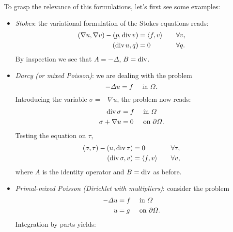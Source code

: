 To grasp the relevance of this formulations, let's first see some examples:
\begin{itemize}
    \item \emph{Stokes}: the variational formulation of the Stokes equations reads:
    \begin{equation}
        \begin{aligned}
            (\nabla u, \nabla v) - (p, \operatorname{\text{div}} v) &= \langle f, v \rangle &&\quad\forall v, \\
            (\operatorname{\text{div}} u, q) &= 0 &&\quad \forall q.
        \end{aligned}
    \end{equation}
    By inspection we see that $A=-\Delta$, $B=\operatorname{\text{div}}$.
    \item \emph{Darcy (or mixed Poisson)}: we are dealing with the problem
    \begin{equation}
        -\Delta u = f\quad \text{ in }\Omega.
    \end{equation}
    Introducing the variable $\sigma = -\nabla u$, the problem now reads:
    \begin{equation}
        \begin{aligned}
            \operatorname{\text{div}} \sigma &= f && \text{ in }  \Omega\\ 
            \sigma + \nabla u &= 0 && \text{ on } \partial\Omega.
        \end{aligned}
    \end{equation}
    Testing the equation on $\tau$,
    \begin{equation}
        \begin{aligned}
            (\sigma, \tau) - (u, \operatorname{\text{div}} \tau) &= 0
            &&\quad\forall \tau, \\ 
            (\operatorname{\text{div}} \sigma, v) &= \langle f,v \rangle
            &&\quad \forall v,
        \end{aligned}
    \end{equation}
    where $A$ is the identity operator and $B=\operatorname{\text{div}}$ as before.
    \item \emph{Primal-mixed Poisson (Dirichlet with multipliers)}: consider the problem
    \begin{equation}
        \begin{aligned}
            -\Delta u &= f &&\text{ in } \Omega \\ 
            u &= g &&\text{ on } \partial\Omega.
        \end{aligned}
    \end{equation}
    Integration by parts yields:
    \begin{equation}

\end{equation}
\end{itemize}
